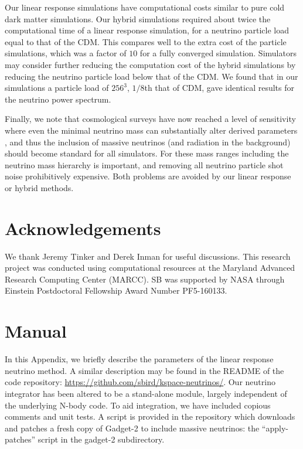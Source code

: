 \documentclass[useAMS, usenatbib]{mnras}
\begin{document}
Our linear response simulations have computational costs similar to pure cold dark matter simulations. Our hybrid simulations required about twice the computational time of a linear response simulation, for a neutrino particle load equal to that of the CDM. This compares well to the extra cost of the particle simulations, which was a factor of $10$ for a fully converged simulation. Simulators may consider further reducing the computation cost of the hybrid simulations by reducing the neutrino particle load below that of the CDM. We found that in our simulations a particle load of $256^3$, $1/8$th that of CDM, gave identical results for the neutrino power spectrum.

Finally, we note that cosmological surveys have now reached a level of sensitivity where even the minimal neutrino mass can substantially alter derived parameters \citep{Calabrese_2017}, and thus the inclusion of massive neutrinos (and radiation in the background) should become standard for all simulators. For these mass ranges including the neutrino mass hierarchy is important, and removing all neutrino particle shot noise prohibitively expensive. Both problems are avoided by our linear response or hybrid methods.

\section*{Acknowledgements}

We thank Jeremy Tinker and Derek Inman for useful discussions.
This research project was conducted using computational resources
at the Maryland Advanced Research Computing Center (MARCC). SB was supported by NASA through
Einstein Postdoctoral Fellowship Award Number PF5-160133.

\appendix

\section{Manual}
\label{sec:manual}

In this Appendix, we briefly describe the parameters of the linear response neutrino method. A similar description may be found in the README of the code repository: \url{https://github.com/sbird/kspace-neutrinos/}. Our neutrino integrator has been altered to be a stand-alone module, largely independent of the underlying N-body code. To aid integration, we have included copious comments and unit tests. A script is provided in the repository which downloads and patches a fresh copy of Gadget-2 to include massive neutrinos: the ``apply-patches'' script in the gadget-2 subdirectory.
\end{document}

